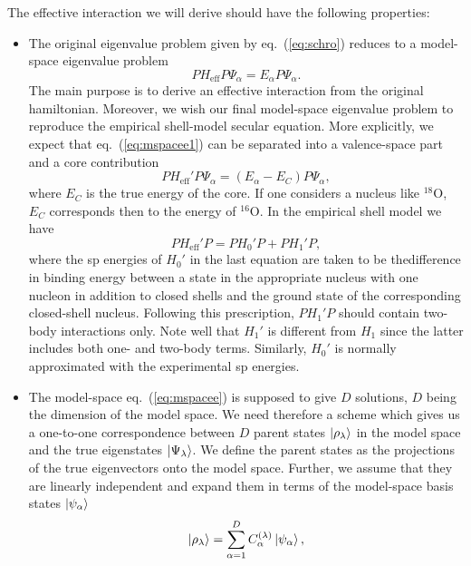 The effective interaction we will derive should have the following
properties:
\begin{itemize}
\item The original eigenvalue problem given by eq.\ (\ref{eq:schro})
 reduces to a model-space eigenvalue problem
\begin{equation}
    PH_{\mathrm{eff}}P\Psi_{\alpha} = E_{\alpha} P\Psi_{\alpha}.
    \label{eq:mspacee1}
\end{equation}
 The main purpose is to derive an effective interaction from the 
  original hamiltonian. Moreover, we wish our final model-space
  eigenvalue problem to reproduce the empirical shell-model
  secular equation. More explicitly, we expect that eq.\ (\ref{eq:mspacee1})
  can be separated into a valence-space part and a core contribution
\begin{equation}
    PH_{\mathrm{eff}}'P\Psi_{\alpha} = 
    \left( E_{\alpha} -E_C\right) P\Psi_{\alpha},
    \label{eq:mspacee}
\end{equation}
  where $E_C$ is the true energy of the core. If one considers a nucleus
 like $^{18}$O, $E_C$ corresponds then to the energy of $^{16}$O.
 In the empirical shell model we have
\begin{equation}
  PH_{\mathrm{eff}}'P = PH_0'P + PH_1'P,
\end{equation}
 where the sp energies of $H_0'$ in the last equation are taken
 to be thedifference in binding energy between a state in the appropriate nucleus
 with one nucleon in addition to closed shells and the ground state of
the corresponding closed-shell nucleus. Following this prescription,
 $PH_1'P$ should contain two-body interactions only. Note well that 
 $H_1'$ is different from $H_1$ since the latter includes both one-
and two-body terms. Similarly, $H_0'$ is normally approximated with the
experimental sp energies.
\item
  The model-space eq.\ (\ref{eq:mspacee}) is supposed to give
  $D$ solutions, $D$ being the dimension of the model space. We need therefore
  a scheme which gives us a one-to-one correspondence between $D$ parent
states $\left| \rho_{\lambda} \right\rangle$ in the model space and the true eigenstates 
$\left| \Psi_{\lambda} \right\rangle$. 
We define the parent states as the projections of the true eigenvectors
onto the model space. Further, we assume that they are linearly independent
and expand them in terms of the model-space basis states $\left| \psi_{\alpha} \right\rangle$
\begin{equation}
    \ket{\rho_{\lambda}}=\sum_{\alpha=1}^{D}
    C_{\alpha}^{(\lambda)}\ket{\psi_{\alpha}},

\end{equation}
\end{itemize}
